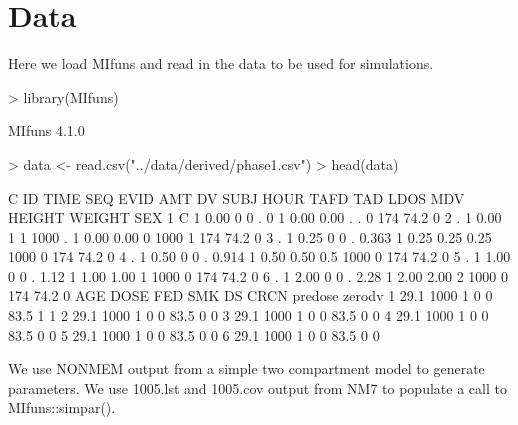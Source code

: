 \section{Data}
Here we load MIfuns and read in the data to be used
for simulations.
\begin{Schunk}
\begin{Sinput}
> library(MIfuns)
\end{Sinput}
\begin{Soutput}
MIfuns 4.1.0 
\end{Soutput}
\begin{Sinput}
> data <- read.csv("../data/derived/phase1.csv")
> head(data)
\end{Sinput}
\begin{Soutput}
  C ID TIME SEQ EVID  AMT    DV SUBJ HOUR TAFD  TAD LDOS MDV HEIGHT WEIGHT SEX
1 C  1 0.00   0    0    .     0    1 0.00 0.00    .    .   0    174   74.2   0
2 .  1 0.00   1    1 1000     .    1 0.00 0.00    0 1000   1    174   74.2   0
3 .  1 0.25   0    0    . 0.363    1 0.25 0.25 0.25 1000   0    174   74.2   0
4 .  1 0.50   0    0    . 0.914    1 0.50 0.50  0.5 1000   0    174   74.2   0
5 .  1 1.00   0    0    .  1.12    1 1.00 1.00    1 1000   0    174   74.2   0
6 .  1 2.00   0    0    .  2.28    1 2.00 2.00    2 1000   0    174   74.2   0
   AGE DOSE FED SMK DS CRCN predose zerodv
1 29.1 1000   1   0  0 83.5       1      1
2 29.1 1000   1   0  0 83.5       0      0
3 29.1 1000   1   0  0 83.5       0      0
4 29.1 1000   1   0  0 83.5       0      0
5 29.1 1000   1   0  0 83.5       0      0
6 29.1 1000   1   0  0 83.5       0      0
\end{Soutput}
\end{Schunk}
We use NONMEM output from a simple two compartment model to generate parameters.
We use 1005.lst and 1005.cov output from NM7 to populate a call to MIfuns::simpar().
